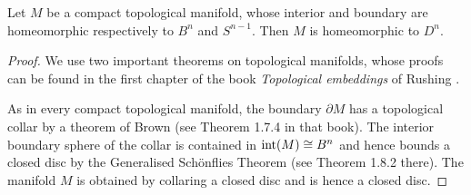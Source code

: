 \begin{teo} \label{topological:disc:teo}
Let $M$ be a compact topological manifold, whose interior and boundary are homeomorphic respectively to $B^n$ and $S^{n-1}$. Then $M$ is homeomorphic to $D^n$.
\end{teo}
\begin{proof}
We use two important theorems on topological manifolds, whose proofs can be found in the first chapter of the book \emph{Topological embeddings} of Rushing \cite{Ru}.

As in every compact topological manifold, the boundary $\partial M$ has a topological collar by a theorem of Brown (see Theorem 1.7.4 in that book). The interior boundary sphere of the collar is contained in ${\rm int}(M) \cong B^n$ and hence bounds a closed disc by the Generalised Sch\"onflies Theorem (see Theorem 1.8.2 there). The manifold $M$ is obtained by collaring a closed disc and is hence a closed disc.
\end{proof}


